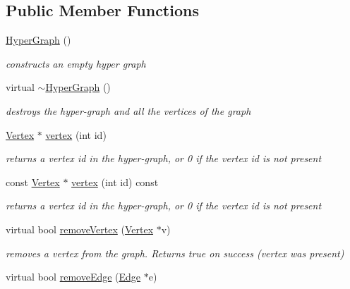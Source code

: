 \subsection*{Public Member Functions}
\begin{DoxyCompactItemize}
\item 
\hyperlink{classg2o_1_1HyperGraph_a833632b111cfc7cf08b842ae3cb43d41}{Hyper\+Graph} ()
\begin{DoxyCompactList}\small\item\em constructs an empty hyper graph \end{DoxyCompactList}\item 
virtual \hyperlink{classg2o_1_1HyperGraph_a0ef6e1d65e0f9171a518bce3fc559693}{$\sim$\+Hyper\+Graph} ()
\begin{DoxyCompactList}\small\item\em destroys the hyper-\/graph and all the vertices of the graph \end{DoxyCompactList}\item 
\hyperlink{classg2o_1_1HyperGraph_1_1Vertex}{Vertex} $\ast$ \hyperlink{classg2o_1_1HyperGraph_ab07fe8bd9982a66ba34e83dff8317ea2}{vertex} (int id)
\begin{DoxyCompactList}\small\item\em returns a vertex {\itshape id} in the hyper-\/graph, or 0 if the vertex id is not present \end{DoxyCompactList}\item 
const \hyperlink{classg2o_1_1HyperGraph_1_1Vertex}{Vertex} $\ast$ \hyperlink{classg2o_1_1HyperGraph_a685a30debc0c540cc10c1bfc669ad2f1}{vertex} (int id) const 
\begin{DoxyCompactList}\small\item\em returns a vertex {\itshape id} in the hyper-\/graph, or 0 if the vertex id is not present \end{DoxyCompactList}\item 
virtual bool \hyperlink{classg2o_1_1HyperGraph_a97ab8302aa027d513253387bba9e0dd5}{remove\+Vertex} (\hyperlink{classg2o_1_1HyperGraph_1_1Vertex}{Vertex} $\ast$v)
\begin{DoxyCompactList}\small\item\em removes a vertex from the graph. Returns true on success (vertex was present) \end{DoxyCompactList}\item 
virtual bool \hyperlink{classg2o_1_1HyperGraph_a33e5a60705ce673d647aa1613da9d99b}{remove\+Edge} (\hyperlink{classg2o_1_1HyperGraph_1_1Edge}{Edge} $\ast$e)

\end{DoxyCompactItemize}

